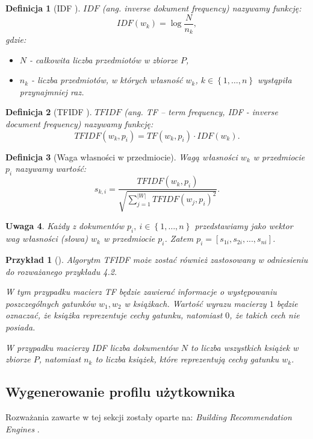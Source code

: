 \documentclass[12pt,a4paper]{report}
\newtheorem{df}{Definicja}[chapter]
\newtheorem{przyklad}{Przykład}[chapter]
\newtheorem{uwaga}[df]{Uwaga}
\newcommand{\set}[1]{\left\lbrace {#1} \right\rbrace}
\newcommand{\setPrzedmioty}{\mathit{P}}
\begin{document}
\begin{df}[IDF {\citep[Sec 3.3.1.1]{rsh}}]
$IDF$ (ang. \textit{inverse dokument frequency}) nazywamy funkcję:
$$
IDF(w_k) = \log \frac{N}{n_k},
$$
gdzie:
\begin{itemize}
\item $N$ - całkowita liczba przedmiotów w zbiorze $\setPrzedmioty$,
\item $n_k$ - liczba przedmiotów, w których własność $w_k$, $k \in \set{1, \ldots, n}$ wystąpiła przynajmniej raz.
\end{itemize}
\end{df}

\begin{df}[TFIDF {\citep[Sec 3.3.1.1]{rsh}}]
$TFIDF$ (ang. \textit{TF – term frequency, IDF - inverse document frequency}) nazywamy funkcję:
$$
TFIDF(w_k, p_i) = TF(w_k, p_i) \cdot IDF(w_k).
$$
\end{df}

\begin{df}[Waga własności w przedmiocie]
Wagą własności $w_k$ w przedmiocie $p_i$ nazywamy wartość:
$$
s_{k,i} = \frac{TFIDF(w_k, p_i)}{\sqrt{ \sum_{j=1}^{|W|}{TFIDF(w_j, p_i)}^2}}.
$$
\end{df}

\begin{uwaga}
Każdy z dokumentów $p_i, \: i\in\set{1,\ldots,n} $ przedstawiamy jako wektor wag własności (słowa) $w_k$ w przedmiocie $p_i$. Zatem $ p_i = [s_{1i}, s_{2i},...,s_{ni}] $.
\end{uwaga}

\begin{przyklad} [{\citep[Sec 3]{bre}}]
Algorytm TFIDF może zostać również zastosowany w odniesieniu do rozważanego przykładu 4.2.

W tym przypadku macierz TF będzie zawierać informacje o występowaniu poszczególnych gatunków $w_1,w_2$ w książkach.
Wartość wyrazu macierzy $1$ będzie oznaczać, że książka reprezentuje cechy gatunku, natomiast $0$, że takich cech nie posiada.

W przypadku macierzy IDF liczba dokumentów $N$ to liczba wszystkich książek w zbiorze $\setPrzedmioty$, natomiast $n_k$ to liczba książek, które reprezentują cechy gatunku $w_k$.
\end{przyklad}
\bigskip
\bigskip
\bigskip

\subsection{Wygenerowanie profilu użytkownika}
Rozważania zawarte w tej sekcji zostały oparte na: \textit{Building Recommendation Engines} {\citep[Sec 3]{bre}}.
\end{document}
